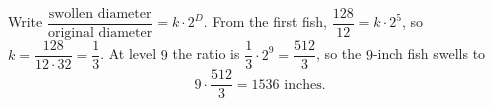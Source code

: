 Write $\dfrac{\text{swollen diameter}}{\text{original diameter}}=k\cdot2^D$. From the first fish, $\dfrac{128}{12}=k\cdot2^5$, so $k=\dfrac{128}{12\cdot32}=\dfrac13$. At level $9$ the ratio is $\dfrac13\cdot2^9=\dfrac{512}{3}$, so the $9$-inch fish swells to
\[9\cdot\dfrac{512}{3}=\boxed{1536\text{ inches}}.\]
